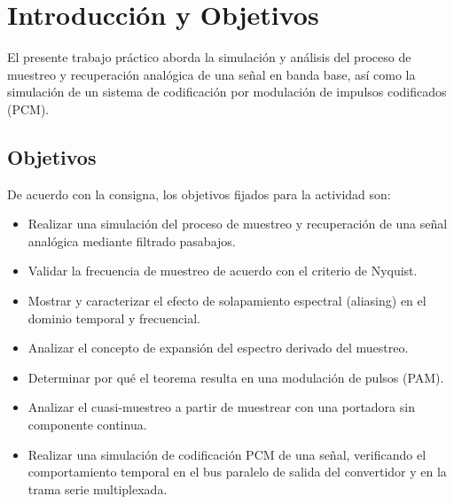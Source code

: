 \chapter{Introducción y Objetivos}
\label{sec.ej4:introduccion}

El presente trabajo práctico aborda la simulación y análisis del proceso de muestreo y recuperación analógica de una
señal en banda base, así como la simulación de un sistema de codificación por modulación de impulsos codificados (PCM).

\section{Objetivos}
De acuerdo con la consigna, los objetivos fijados para la actividad son:
\begin{itemize}
    \item Realizar una simulación del proceso de muestreo y recuperación de una señal analógica mediante filtrado
          pasabajos.
    \item Validar la frecuencia de muestreo de acuerdo con el criterio de Nyquist.
    \item Mostrar y caracterizar el efecto de solapamiento espectral (aliasing) en el dominio temporal y frecuencial.
    \item Analizar el concepto de expansión del espectro derivado del muestreo.
    \item Determinar por qué el teorema resulta en una modulación de pulsos (PAM).
    \item Analizar el cuasi-muestreo a partir de muestrear con una portadora sin componente continua.
    \item Realizar una simulación de codificación PCM de una señal, verificando el comportamiento temporal en el bus
          paralelo de salida del convertidor y en la trama serie multiplexada.
\end{itemize}

